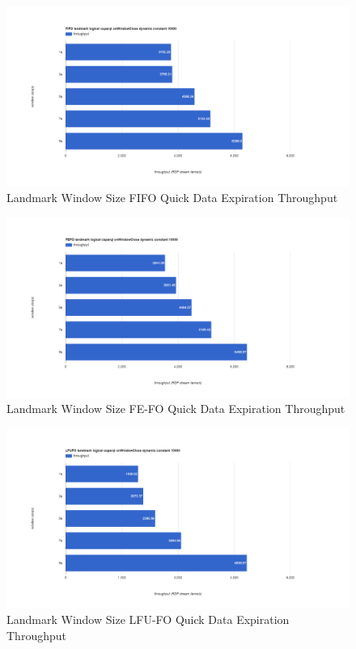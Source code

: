 \begin{figure}[!htbp]
	\centering
    \includegraphics[width=\textwidth]{img/app3-land-ws-fifo-quick-t.png}
    \caption{Landmark Window Size FIFO Quick Data Expiration Throughput}
\end{figure}
\begin{figure}[!htbp]
	\centering
    \includegraphics[width=\textwidth]{img/app3-land-ws-fefo-quick-t.png}
    \caption{Landmark Window Size FE-FO Quick Data Expiration Throughput}
\end{figure}
\begin{figure}[!htbp]
	\centering
    \includegraphics[width=\textwidth]{img/app3-land-ws-lfufo-quick-t.png}
    \caption{Landmark Window Size LFU-FO Quick Data Expiration Throughput}
\end{figure}
